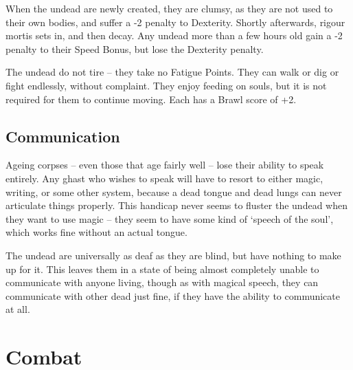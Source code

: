 \begin{multicols}{2}
When the undead are newly created, they are clumsy, as they are not used to their own bodies, and suffer a -2 penalty to Dexterity.
Shortly afterwards, rigour mortis sets in, and then decay.
Any undead more than a few hours old gain a -2 penalty to their Speed Bonus, but lose the Dexterity penalty.

The undead do not tire -- they take no Fatigue Points.
They can walk or dig or fight endlessly, without complaint.
They enjoy feeding on souls, but it is not required for them to continue moving.
Each has a Brawl score of +2.

\subsection{Communication}

Ageing corpses -- even those that age fairly well -- lose their ability to speak entirely.
Any ghast who wishes to speak will have to resort to either magic, writing, or some other system, because a dead tongue and dead lungs can never articulate things properly.
This handicap never seems to fluster the undead when they want to use magic -- they seem to have some kind of `speech of the soul', which works fine without an actual tongue.

The undead are universally as deaf as they are blind, but have nothing to make up for it.
This leaves them in a state of being almost completely unable to communicate with anyone living, though as with magical speech, they can communicate with other dead just fine, if they have the ability to communicate at all.

\end{multicols}

\section{Combat}

